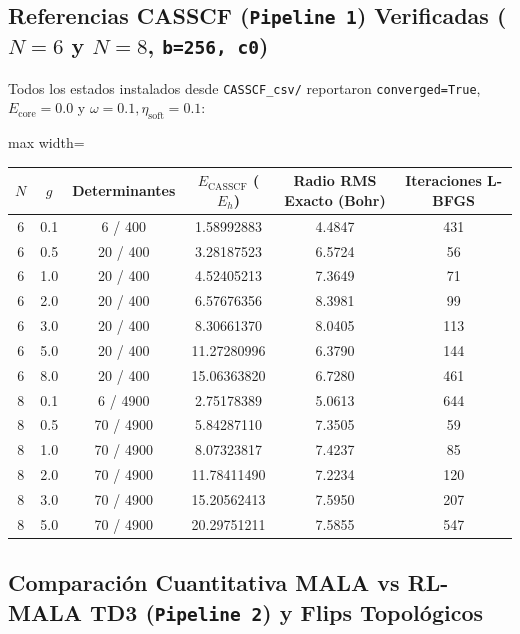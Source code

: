 \documentclass[10pt,a4paper]{article}
\begin{document}
\subsection{Referencias CASSCF (\texttt{Pipeline 1}) Verificadas ($N=6$ y $N=8$, \texttt{b=256, c0})}

Todos los estados instalados desde \texttt{CASSCF\_csv/} reportaron \texttt{converged=True}, $E_{\mathrm{core}}=0.0$ y $\omega=0.1, \eta_{\mathrm{soft}}=0.1$:

\begin{table}[H]
\centering
\begin{adjustbox}{max width=\textwidth}
\begin{tabular}{cccccc}
\toprule
$N$ & $g$ & Determinantes & $E_{\mathrm{CASSCF}}$ ($E_h$) & Radio RMS Exacto (Bohr) & Iteraciones L-BFGS \\
\midrule
6 & 0.1 & 6 / 400 & 1.58992883 & 4.4847 & 431 \\
6 & 0.5 & 20 / 400 & 3.28187523 & 6.5724 & 56 \\
6 & 1.0 & 20 / 400 & 4.52405213 & 7.3649 & 71 \\
6 & 2.0 & 20 / 400 & 6.57676356 & 8.3981 & 99 \\
6 & 3.0 & 20 / 400 & 8.30661370 & 8.0405 & 113 \\
6 & 5.0 & 20 / 400 & 11.27280996 & 6.3790 & 144 \\
6 & 8.0 & 20 / 400 & 15.06363820 & 6.7280 & 461 \\
\midrule
8 & 0.1 & 6 / 4900 & 2.75178389 & 5.0613 & 644 \\
8 & 0.5 & 70 / 4900 & 5.84287110 & 7.3505 & 59 \\
8 & 1.0 & 70 / 4900 & 8.07323817 & 7.4237 & 85 \\
8 & 2.0 & 70 / 4900 & 11.78411490 & 7.2234 & 120 \\
8 & 3.0 & 70 / 4900 & 15.20562413 & 7.5950 & 207 \\
8 & 5.0 & 70 / 4900 & 20.29751211 & 7.5855 & 547 \\
\bottomrule
\end{tabular}
\end{adjustbox}
\end{table}

\subsection{Comparación Cuantitativa MALA vs RL-MALA TD3 (\texttt{Pipeline 2}) y Flips Topológicos}
\end{document}
